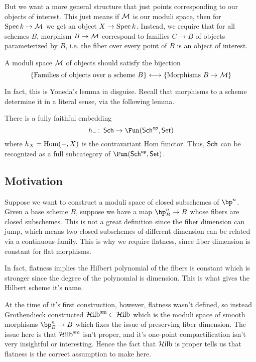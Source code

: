 \documentclass[12pt]{article}
\begin{document}
But we want a more general structure that just points corresponding to our objects of interest. This just means if $\mathcal{M}$ is our moduli space, then for $\operatorname{Spec} k \to \mathcal{M}$ we get an object $X \to \operatorname{Spec} k$. Instead, we require that for all schemes $B$, morphism $B \to \mathcal{M}$ correspond to families $C \to B$ of objects parameterized by $B$, i.e. the fiber over every point of $B$ is an object of interest.

\begin{philo} A moduli space $\mathcal{M}$ of objects should satisfy the bijection 
\[\{\text{Families of objects over a scheme } B\} \longleftrightarrow \{\text{Morphisms } B \to \mathcal{M} \}\]
\end{philo}

In fact, this is Yoneda's lemma in disguise. Recall that morphisms to a scheme determine it in a literal sense, via the following lemma.

\begin{lem}
  There is a fully faithful embedding
  \[h_{-} \colon \Sch \to \Fun(\Sch^{\op}, \Set)\]
  where $h_X = \operatorname{Hom}(-, X)$ is the contravariant Hom functor. Thus, $\operatorname{\mathsf{Sch}}$ can be recognized as a full subcategory of $\Fun(\Sch^{\op}, \Set)$. 
\end{lem}

\subsection{Motivation}

Suppose we want to construct a moduli space of closed subschemes of $\bp^n$. Given a base scheme $B$, suppose we have a map $\bp^n_B \to B$ whose fibers are closed subschemes. This is not a great definition since the fiber dimension can jump, which means two closed subschemes of different dimension can be related via a continuous family. This is why we require flatness, since fiber dimension is constant for flat morphisms.

\begin{rem}
  In fact, flatness implies the Hilbert polynomial of the fibers is constant which is stronger since the degree of the polynomial is dimension. This is what gives the Hilbert scheme it's name.
\end{rem}

At the time of it's first construction, however, flatness wasn't defined, so instead Grothendieck constructed $\operatorname{\mathcal{H} ilb}^{\text{sm}} \subset \operatorname{\mathcal{H} ilb}$ which is the moduli space of smooth morphisms $\bp^n_B \to B$ which fixes the issue of preserving fiber dimension. The issue here is that $\operatorname{\mathcal{H} ilb}^{\text{sm}}$ isn't proper, and it's one-point compactification isn't very insightful or interesting. Hence the fact that $\operatorname{\mathcal{H} ilb}$ is proper tells us that flatness is the correct assumption to make here.
\end{document}
